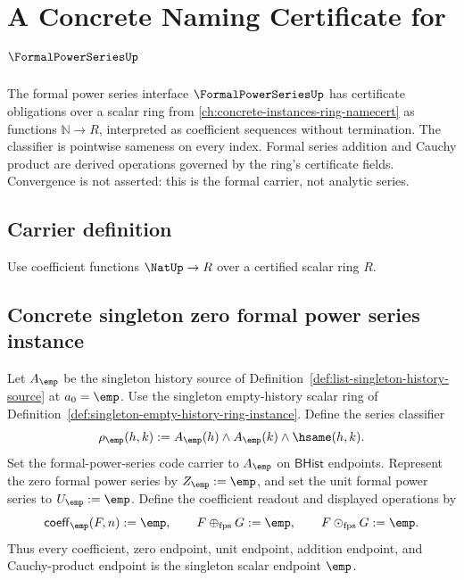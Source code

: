 \chapter{A Concrete Naming Certificate for \(\FormalPowerSeriesUp\)}
\label{ch:concrete-instances-fps-namecert}

The formal power series interface \(\FormalPowerSeriesUp\) has certificate obligations over a scalar ring from \autoref{ch:concrete-instances-ring-namecert} as functions \(\mathbb{N} \to R\), interpreted as coefficient sequences without termination. The classifier is pointwise sameness on every index. Formal series addition and Cauchy product are derived operations governed by the ring's certificate fields. Convergence is not asserted: this is the formal carrier, not analytic series.

\section{Carrier definition}

\begin{definition}
\label{def:fps-carrier}
Use coefficient functions \(\NatUp\to R\) over a certified scalar ring \(R\).
\end{definition}

\section{Concrete singleton zero formal power series instance}
\label{sec:fps-concrete-singleton-zero-series-instance}
\label{sec:fps-concrete-singleton-instance}

\begin{definition}
\label{def:singleton-zero-fps-instance}
\label{def:singleton-empty-history-fps-instance}
Let $A_{\emp}$ be the singleton history source of
Definition~\ref{def:list-singleton-history-source} at $a_0=\emp$. Use the
singleton empty-history scalar ring of
Definition~\ref{def:singleton-empty-history-ring-instance}. Define the series
classifier
$$
\rho_{\emp}(h,k):=
A_{\emp}(h)\land A_{\emp}(k)\land\hsame(h,k).
$$
Set the formal-power-series code carrier to $A_{\emp}$ on
$\mathsf{BHist}$ endpoints. Represent the zero formal power series by
$Z_{\emp}:=\emp$, and set the unit formal power series to
$U_{\emp}:=\emp$. Define the coefficient readout and displayed operations by
$$
\mathsf{coeff}_{\emp}(F,n):=\emp,\qquad
F\oplus_{\mathrm{fps}}G:=\emp,\qquad
F\odot_{\mathrm{fps}}G:=\emp.
$$
Thus every coefficient, zero endpoint, unit endpoint, addition endpoint, and
Cauchy-product endpoint is the singleton scalar endpoint $\emp$.
\end{definition}

